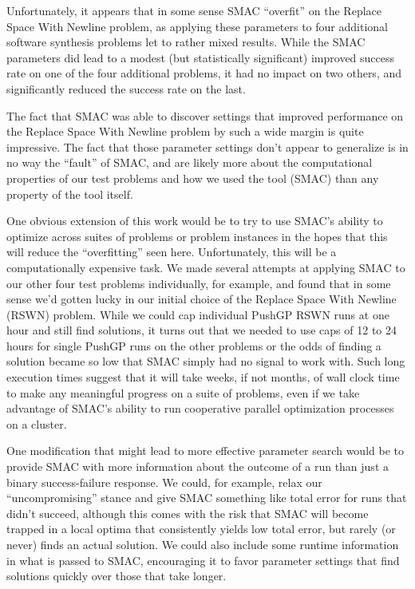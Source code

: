 Unfortunately, it appears that in some sense SMAC ``overfit'' on the Replace
Space With Newline problem, as applying these parameters to four additional
software synthesis problems let to rather mixed results. While the SMAC
parameters did lead to a modest (but statistically significant) improved 
success rate on one of the four additional problems, it had no impact on
two others, and significantly reduced the success rate on the last.

The fact that SMAC was able to discover settings that improved
performance on the Replace Space With Newline problem by such a wide margin
is quite impressive. The fact that those parameter settings don't appear to
generalize is in no way the ``fault'' of SMAC, and are likely more 
about the computational properties of our test problems and how we used 
the tool (SMAC) than any property of the tool itself.

One obvious extension of this work would be to try to use SMAC's ability
to optimize across suites of problems or problem instances in the hopes
that this will reduce the ``overfitting'' seen here. Unfortunately, this will
be a computationally expensive task. We made several attempts at applying
SMAC to our other four test problems individually, for example, and found
that in some sense we'd gotten lucky in our initial choice of the Replace
Space With Newline (RSWN) problem. While we could cap individual  PushGP
RSWN runs at one hour and still find solutions, it turns out that we needed
to use caps of 12 to 24 hours for single PushGP runs on the other problems
or the odds of finding a solution became so low that SMAC simply had no
signal to work with. Such long execution times suggest that it will take
weeks, if not months, of wall clock time to make any meaningful progress
on a suite of problems, even if we take advantage of SMAC's ability to run
cooperative parallel optimization processes on a cluster.

One modification that might lead to more effective parameter search
would be to provide SMAC with more information about the outcome of a
run than just a binary success-failure response. We could, for example,
relax our ``uncompromising'' stance and give SMAC something like total
error for runs that didn't succeed, although this comes with the risk that 
SMAC will become trapped in a local optima that consistently yields low
total error, but rarely (or never) finds an actual solution. We could also
include some runtime information in what is passed to SMAC, encouraging
it to favor parameter settings that find solutions quickly over those that take
longer.

